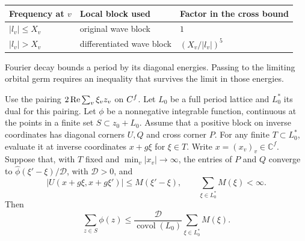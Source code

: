 \begin{construction}
\begin{tabular}{@{}lll@{}}\toprule
Frequency at \(v\) & Local block used & Factor in the cross bound\\\midrule
\(|l_v|\le X_v\) & original wave block & \(1\)\\
\(|l_v|>X_v\) & differentiated wave block & \((X_v/|l_v|)^5\)\\\bottomrule
\end{tabular}
\caption{Choice of a local block before taking its Schur product with the history kernel. The local gains multiply, and the averaged diagonal forms can then be tested on the same history.}\label{fig:frequency-block-choice}
\end{construction}

Fourier decay bounds a period by its diagonal energies. Passing to the limiting orbital germ requires an inequality that survives the limit in those energies.

\begin{lemma}\label{lem:germ-period}
Use the pairing \(2\operatorname{Re}\sum_v \xi_v z_v\) on \(C^f\).
Let \(L_0\) be a full period lattice and \(L_0^*\) its dual for
this pairing. Let \(\phi\) be a nonnegative integrable function,
continuous at the points in a finite set \(S\subset z_0+L_0\).
Assume that a positive block on inverse coordinates has diagonal
corners \(U,Q\) and cross corner \(P\). For any finite
\(T\subset L_0^*\), evaluate it at inverse coordinates
\(x+g\xi\) for \(\xi\in T\). Write \(x=(x_v)_v\in\mathbb C^f\).
Suppose that, with \(T\) fixed and \(\min_v|x_v|\to\infty\), the entries
of \(P\) and \(Q\) converge to
\(\widehat\phi(\xi'-\xi)/\mathcal D\), with \(\mathcal D>0\),
and
\[
 |U(x+g\xi,x+g\xi')|\le M(\xi'-\xi),
 \qquad \sum_{\xi\in L_0^*}M(\xi)<\infty .
\]
Then
\[
 \sum_{z\in S}\phi(z)
 \le \frac{\mathcal D}{\operatorname{covol}(L_0)}
     \sum_{\xi\in L_0^*}M(\xi).
\]
\end{lemma}

